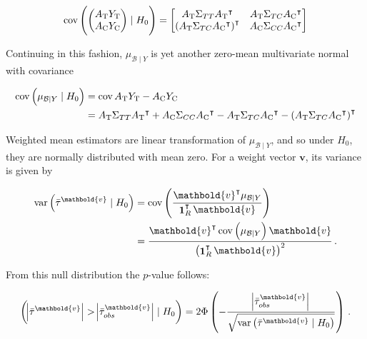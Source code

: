 \documentclass[letter]{article}
\let\Pr\relax
\DeclareMathOperator{\Pr}{\mathbb{P}}
\DeclareMathOperator{\cov}{{cov}}
\DeclareMathOperator{\var}{{var}}
\DeclareMathOperator{\ones}{\mathbf{1}}
\newcommand{\trans}{^{\intercal}}
\newcommand{\treat}{\mathrm{T}}
\newcommand{\ctrol}{\mathrm{C}}
\newcommand{\vvec}{\mathbold{v}}
\newcommand{\boundary}{\mathcal{B}}
\newcommand{\numsent}{R}
\begin{document}
\begin{equation}
    \cov \del{\begin{pmatrix}A_\treat{} Y_\treat{} \\ A_\ctrol{} Y_\ctrol{} \end{pmatrix} \mid H_0 } = \begin{bmatrix}
                        A_\treat{} \Sigma_{TT} A_\treat{}\trans & A_\treat{} \Sigma_{TC} A_\ctrol{}\trans \\
                        \del{A_\treat{} \Sigma_{TC} A_\ctrol{} \trans}\trans & A_\ctrol{} \Sigma_{CC} A_\ctrol{}\trans
                    \end{bmatrix}
\end{equation}

Continuing in this fashion, \(\mu_{\boundary \mid Y}\) is yet another zero-mean multivariate normal with covariance
    


    	\begin{equation}
\begin{split}
    \cov \del{\mu_{\boundary \mid Y} \mid H_0} &= \cov{ A_\treat{} Y_\treat{} - A_\ctrol{} Y_\ctrol{} } \\
        &= A_\treat{} \Sigma_{TT} A_\treat{}\trans + A_\ctrol{} \Sigma_{CC} A_\ctrol{}\trans - A_\treat{} \Sigma_{TC} A_\ctrol{}\trans -  \del{A_\treat{}\Sigma_{TC} A_\ctrol{}\trans}\trans
\end{split}
\end{equation}
    


    	Weighted mean estimators are linear transformation of \(\mu_{\boundary \mid Y}\), and so under \(H_0\), they are normally distributed with mean zero.
For a weight vector \(\vvec\), its variance is given by

\begin{equation}
\begin{aligned}
    \var\del{\bar{\tau}^\vvec \mid H_0} &= \cov\del{ \frac{\vvec \trans \mu_{\boundary \mid Y}}{\ones_{\numsent}\trans \vvec}} \\
    &= \frac{\vvec \trans \cov \del{\mu_{\boundary \mid Y}} \vvec}{\del{\ones_{\numsent}\trans \vvec}^2}
    \,.
\end{aligned}
\end{equation}
    


    	From this null distribution the \(p\)-value follows:

\begin{equation}
    \Pr\del{ \abs{\bar{\tau}^\vvec} > \abs{\bar{\tau}_{obs}^\vvec} \mid H_0} = 2 \Phi\del{ -\frac{\abs{\bar{\tau}_{obs}^\vvec}}{\sqrt{\var\del{\bar{\tau}^\vvec \mid H_0}}} }\,.
\end{equation}
\end{document}
